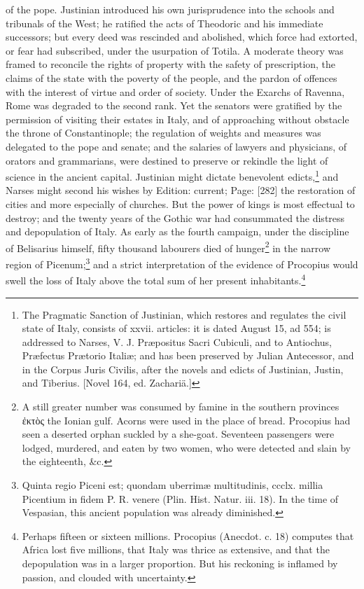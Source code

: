 of the pope. Justinian introduced his own jurisprudence into the schools and tribunals of the West; he ratified the acts of Theodoric and his immediate successors; but every deed was rescinded and abolished, which force had extorted, or fear had subscribed, under the usurpation of Totila. A moderate theory was framed to reconcile the rights of property with the safety of prescription, the claims of the state with the poverty of the people, and the pardon of offences with the interest of virtue and order of society. Under the Exarchs of Ravenna, Rome was degraded to the second rank. Yet the senators were gratified by the permission of visiting their estates in Italy, and of approaching without obstacle the throne of Constantinople; the regulation of weights and measures was delegated to the pope and senate; and the salaries of lawyers and physicians, of orators and grammarians, were destined to preserve or rekindle the light of science in the ancient capital. Justinian might dictate benevolent edicts,\footnote{The Pragmatic Sanction of Justinian, which restores and regulates the civil state of Italy, consists of xxvii. articles: it is dated August 15, ad 554; is addressed to Narses, V. J. Præpositus Sacri Cubiculi, and to Antiochus, Præfectus Prætorio Italiæ; and has been preserved by Julian Antecessor, and in the Corpus Juris Civilis, after the novels and edicts of Justinian, Justin, and Tiberius. [Novel 164, ed. Zachariä.]} and Narses might second his wishes by Edition: current; Page: [282] the restoration of cities and more especially of churches. But the power of kings is most effectual to destroy; and the twenty years of the Gothic war had consummated the distress and depopulation of Italy. As early as the fourth campaign, under the discipline of Belisarius himself, fifty thousand labourers died of hunger\footnote{A still greater number was consumed by famine in the southern provinces \textgreek{\texthebrew{ἐ}κτ\texthebrew{ὸ}ς} the Ionian gulf. Acorns were used in the place of bread. Procopius had seen a deserted orphan suckled by a she-goat. Seventeen passengers were lodged, murdered, and eaten by two women, who were detected and slain by the eighteenth, \&c.} in the narrow region of Picenum;\footnote{Quinta regio Piceni est; quondam uberrimæ multitudinis, ccclx. millia Picentium in fidem P. R. venere (Plin. Hist. Natur. iii. 18). In the time of Vespasian, this ancient population was already diminished.} and a strict interpretation of the evidence of Procopius would swell the loss of Italy above the total sum of her present inhabitants.\footnote{Perhaps fifteen or sixteen millions. Procopius (Anecdot. c. 18) computes that Africa lost five millions, that Italy was thrice as extensive, and that the depopulation was in a larger proportion. But his reckoning is inflamed by passion, and clouded with uncertainty.}

